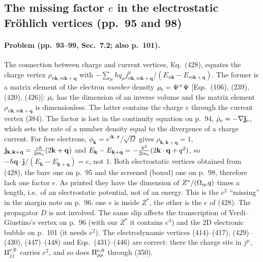 \subsection*{The missing factor $e$ in the electrostatic Fr\"ohlich vertices (pp.~95 and 98)}

\paragraph{Problem (pp.~93--99, Sec.~7.2; also p.~101).}
The connection between charge and current vertices, Eq.~(428), equates the charge vertex
$\rho_{n\mathbf k,m\mathbf k+\mathbf q}$ with
$-\sum_\mu\hbar q_\mu j^\mu_{n\mathbf k,m\mathbf k+\mathbf q}/(E_{n\mathbf k}-E_{m\mathbf k+\mathbf q})$.
The former is a matrix element of the electron \emph{number} density $\rho_{\rm e}=\Psi^+\Psi$
[Eqs.~(106), (239), (420), (426)]: $\rho_{\rm e}$ has the dimension of an inverse volume and the matrix
element $\rho_{n\mathbf k,m\mathbf k+\mathbf q}$ is dimensionless. The latter contains the charge $e$
through the current vertex (384). The factor is lost in the continuity equation on
p.~94, $\dot\rho_{\rm e}=-\nabla\mathbf j_{\rm e}$, which sets the rate of a number density equal to
the divergence of a charge current. For free electrons, $\phi_{\mathbf k}=e^{i\mathbf k\cdot\mathbf r}/\sqrt\Omega$
gives $\rho_{\mathbf k,\mathbf k+\mathbf q}=1$, $\mathbf j_{\mathbf k,\mathbf k+\mathbf q}=\frac{e\hbar}{2m_{\rm e}}(2\mathbf k+\mathbf q)$
and $E_{\mathbf k}-E_{\mathbf k+\mathbf q}=-\frac{\hbar^2}{2m_{\rm e}}(2\mathbf k\cdot\mathbf q+q^2)$, so
$-\hbar\mathbf q\cdot\mathbf j/(E_{\mathbf k}-E_{\mathbf k+\mathbf q})=e$, not $1$. Both electrostatic
vertices obtained from (428), the bare one on p.~95 and the screened (boxed) one on p.~98, therefore
lack one factor $e$. As printed they have the dimension of $Z^*/(\Omega_{\rm uc}q)$ times a length,
i.e.\ of an electrostatic potential, not of an energy. This is the $e^2$ ``missing'' in the margin
note on p.~96: one $e$ is inside $Z^*$, the other is the $e$ of (428). The propagator $D$ is not
involved. The same slip affects the transcription of Verdi--Giustino's vertex on p.~96 (with our
$Z^*$ it contains $e^3$) and the 2D electronic bubble on p.~101 (it needs $e^2$). The electrodynamic
vertices (414)--(417), (429)--(430), (447)--(448) and Eqs.~(431)--(446) are correct: there the charge
sits in $j^\mu$, $\Pi^{\rm e,0}_{jj}$ carries $e^2$, and so does $\Pi^{\rm e,0}_{\rho\rho}$ through (350).

